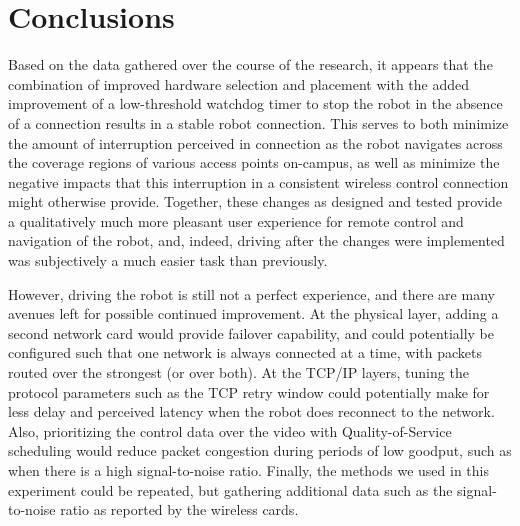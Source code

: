 \documentclass{IEEEtran}
\begin{document}
\section{Conclusions}
Based on the data gathered over the course of the research, it appears that
the combination of improved hardware selection and placement with the added
improvement of a low-threshold watchdog timer to stop the robot in the absence
of a connection results in a stable robot connection. This serves to both
minimize the amount of interruption perceived in connection as the robot
navigates across the coverage regions of various access points on-campus, as
well as minimize the negative impacts that this interruption in a consistent
wireless control connection might otherwise provide. Together, these changes
as designed and tested provide a qualitatively much more pleasant user
experience for remote control and navigation of the robot, and, indeed,
driving after the changes were implemented was subjectively a much easier task
than previously.

However, driving the robot is still not a perfect experience, and there are
many avenues left for possible continued improvement.
At the physical layer, adding a second
network card would provide failover capability, and could potentially be
configured such that one network is always connected at a time, with packets
routed over the strongest (or over both). At the TCP/IP layers, tuning the
protocol parameters such as the TCP retry window could potentially make for
less delay and perceived latency when the robot does reconnect to the network.
Also, prioritizing the control data over the video with Quality-of-Service
scheduling would reduce packet congestion during periods of low goodput, such
as when there is a high signal-to-noise ratio. Finally, the methods we used
in this experiment could be repeated, but gathering additional data such
as the signal-to-noise ratio as reported by the wireless cards.



\end{document}

